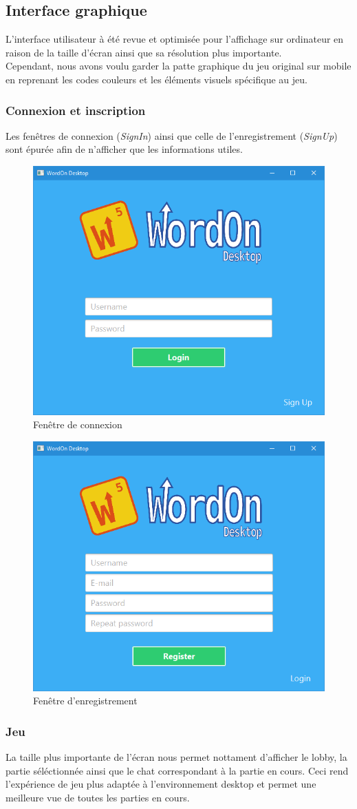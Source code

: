 \documentclass[a4paper,12pt]{article}
\begin{document}
	\subsection{Interface graphique}
	L'interface utilisateur à été revue et optimisée pour l'affichage sur ordinateur en raison de la taille d'écran ainsi que sa résolution plus importante. \\
	Cependant, nous avons voulu garder la patte graphique du jeu original sur mobile en reprenant les codes couleurs et les éléments visuels spécifique au jeu.
	
		\subsubsection{Connexion et inscription}
		Les fenêtres de connexion (\textit{SignIn}) ainsi que celle de l'enregistrement (\textit{SignUp}) sont épurée afin de n'afficher que les informations utiles.
		
		\begin{figure}[h]
			\centering
			\includegraphics[width=0.4\linewidth]{img/signin.jpg}
			\caption{Fenêtre de connexion}
		\end{figure}
	
		\begin{figure}[h]
			\centering
			\includegraphics[width=0.4\linewidth]{img/signup.jpg}
			\caption{Fenêtre d'enregistrement}
		\end{figure}
		
		\subsubsection{Jeu}
		La taille plus importante de l'écran nous permet nottament d'afficher le lobby, la partie séléctionnée ainsi que le chat correspondant à la partie en cours. Ceci rend l'expérience de jeu plus adaptée à l'environnement desktop et permet une meilleure vue de toutes les parties en cours.
		
\end{document}
